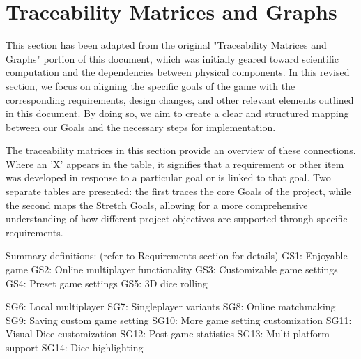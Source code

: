 \section{Traceability Matrices and Graphs}

This section has been adapted from the original "Traceability Matrices and Graphs" portion of this document, which was initially geared toward scientific computation and the dependencies between physical components. In this revised section, we focus on aligning the specific goals of the game with the corresponding requirements, design changes, and other relevant elements outlined in this document. By doing so, we aim to create a clear and structured mapping between our Goals and the necessary steps for implementation.

The traceability matrices in this section provide an overview of these connections. Where an 'X' appears in the table, it signifies that a requirement or other item was developed in response to a particular goal or is linked to that goal. Two separate tables are presented: the first traces the core Goals of the project, while the second maps the Stretch Goals, allowing for a more comprehensive understanding of how different project objectives are supported through specific requirements.

Summary definitions: (refer to Requirements section for details)
GS1: Enjoyable game
GS2: Online multiplayer functionality
GS3: Customizable game settings
GS4: Preset game settings
GS5: 3D dice rolling

SG6: Local multiplayer
SG7: Singleplayer variants
SG8: Online matchmaking
SG9: Saving custom game setting
SG10: More game setting customization
SG11: Visual Dice customization
SG12: Post game statistics
SG13: Multi-platform support
SG14: Dice highlighting

